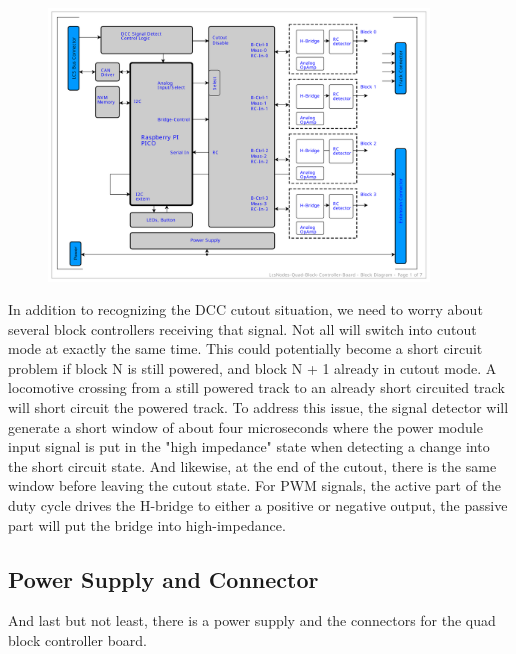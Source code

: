 \begin{figure}[htbp]
    \centering
    \includegraphics[page=6, width=0.9\textwidth]{./Schematics/Schematic_LcsNodes-Quad-Block-Controller.pdf}
\end{figure}
\FloatBarrier

In addition to recognizing the DCC cutout situation, we need to worry about several block controllers receiving that signal. Not all will switch into cutout mode at exactly the same time. This could potentially become a short circuit problem if block N is still powered, and block N + 1 already in cutout mode. A locomotive crossing from a still powered track to an already short circuited track will short circuit the powered track. To address this issue, the signal detector will generate a short window of about four microseconds where the power module input signal is put in the "high impedance" state when detecting a change into the short circuit state. And likewise, at the end of the cutout, there is the same window before leaving the cutout state. For PWM signals, the active part of the duty cycle drives the H-bridge to either a positive or negative output, the passive part will put the bridge into high-impedance.

\subsection{Power Supply and Connector}

And last but not least, there is a power supply and the connectors for the quad block controller board.

